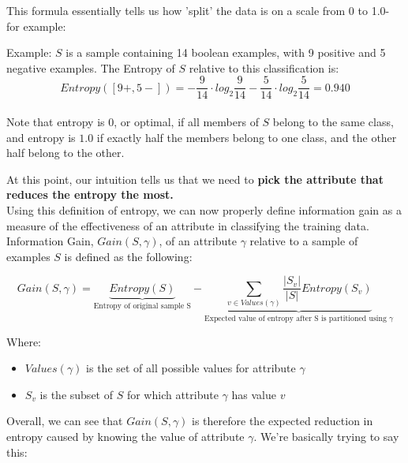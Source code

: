 \documentclass[english, 10pt]{article}
\begin{document}
\hfill \break This formula essentially tells us how 'split' the data is on a scale from 0 to 1.0- for example:\\

\begin{myproof}
Example: $S$ is a sample containing 14 boolean examples, with 9 positive and 5 negative examples. The Entropy of $S$ relative to this classification is:\\

$$ Entropy ([9+, 5-]) = -\frac{9}{14}\cdot log_2\frac{9}{14} - \frac{5}{14}\cdot log_2 \frac{5}{14} = 0.940$$\\

Note that entropy is $0$, or optimal, if all members of $S$ belong to the same class, and entropy is $1.0$ if exactly half the members belong to one class, and the other half belong to the other.
\end{myproof}

\hfill \break At this point, our intuition tells us that we need to \textbf{pick the attribute that reduces the entropy the most.}\\

Using this definition of entropy, we can now properly define information gain as a measure of the effectiveness of an attribute in classifying the training data.\\

Information Gain, $Gain(S,\gamma)$, of an attribute $\gamma$ relative to a sample of examples $S$ is defined as the following: \\
\begin{myproof}
$$Gain(S,\gamma)=\underbrace{Entropy(S)}_{\text{Entropy of original sample S}}-\underbrace{\sum_{v\in Values(\gamma)}{\frac{|S_v|}{|S|}Entropy(S_v)}}_{\text{Expected value of entropy after S is partitioned using } \gamma}$$
\end{myproof}

\hfill \break Where:
\begin{itemize}
	\item $Values(\gamma)$ is the set of all possible values for attribute $\gamma$
	\item $S_v$ is the subset of $S$ for which attribute $\gamma$ has value $v$
\end{itemize}

Overall, we can see that $Gain(S,\gamma)$ is therefore the expected reduction in entropy caused by knowing the value of attribute $\gamma$. We're basically trying to say this:
\end{document}
